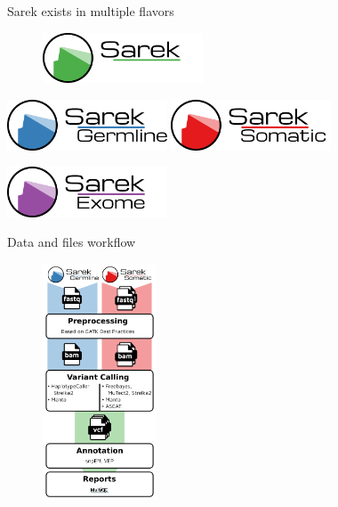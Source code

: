 \documentclass[usepdftitle=false]{beamer}
\begin{document}
\begin{frame}{Sarek exists in multiple flavors}
	\begin{figure}
		\includegraphics[height=1.5cm]{pictures/Sarek}
	\end{figure}
	\vfill
	\pause
	\begin{center}
		\includegraphics[height=1.5cm]{pictures/Sarek_germline}
		\hfill
		\pause
		\includegraphics[height=1.5cm]{pictures/Sarek_somatic}
	\end{center}
	\pause
	\begin{center}
		\includegraphics[height=1.5cm]{pictures/Sarek_exome}
	\end{center}
\end{frame}

\begin{frame}{Data and files workflow}
	\begin{figure}
		\includegraphics[height=7cm]{pictures/Sarek_2-2_workflow}
	\end{figure}
\end{frame}
\end{document}
